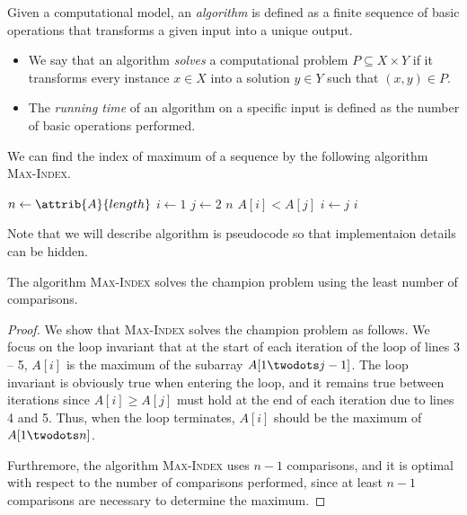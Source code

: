 \begin{definition}
  Given a computational model, an \emph{algorithm} is defined as a finite
  sequence of basic operations that transforms a given input into a unique
  output.
  \begin{itemize}
    \item We say that an algorithm \emph{solves} a computational problem
    $P \subseteq X \times Y$ if it transforms every instance $x \in X$ into a
    solution $y \in Y$ such that $(x, y) \in P$.
    \item The \emph{running time} of an algorithm on a specific input is
    defined as the number of basic operations performed.
  \end{itemize}
\end{definition}

\begin{example}
  We can find the index of maximum of a sequence by the following algorithm
  \textsc{Max-Index}.
  \begin{codebox}
    \li $n \gets \attrib{A}{length}$
    \li $i \gets 1$
    \li \For $j \gets 2$ \To $n$ \Do
    \li     \If $A[i] < A[j]$ \Then
    \li         $i \gets j$
            \End
        \End
    \li \Return $i$
  \end{codebox}
  Note that we will describe algorithm is pseudocode so that implementaion
  details can be hidden.
\end{example}

\begin{theorem}
  The algorithm \textsc{Max-Index} solves the champion problem using the least
  number of comparisons.
\end{theorem}
\begin{proof}
  We show that \textsc{Max-Index} solves the champion problem as follows.
  We focus on the loop invariant that at the start of each iteration of the
  \For loop of lines 3 -- 5, $A[i]$ is the maximum of the subarray
  $A[1 \twodots j-1]$.
  The loop invariant is obviously true when entering the loop, and it remains
  true between iterations since $A[i] \geq A[j]$ must hold at the end of each
  iteration due to lines 4 and 5.
  Thus, when the \For loop terminates, $A[i]$ should be the maximum of
  $A[1 \twodots n]$.

  Furthremore, the algorithm \textsc{Max-Index} uses $n-1$ comparisons, and it
  is optimal with respect to the number of comparisons performed, since at
  least $n-1$ comparisons are necessary to determine the maximum.
\end{proof}